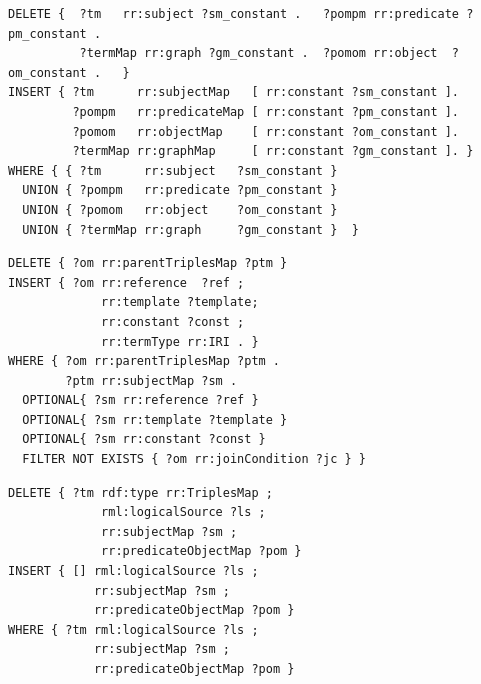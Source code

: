 \vspace{-2mm}
{
\fontsize{6}{6.5}
\begin{verbatim}
DELETE {  ?tm   rr:subject ?sm_constant .   ?pompm rr:predicate ?pm_constant .
          ?termMap rr:graph ?gm_constant .  ?pomom rr:object  ?om_constant .   }
INSERT { ?tm      rr:subjectMap   [ rr:constant ?sm_constant ].
         ?pompm   rr:predicateMap [ rr:constant ?pm_constant ].
         ?pomom   rr:objectMap    [ rr:constant ?om_constant ].
         ?termMap rr:graphMap     [ rr:constant ?gm_constant ]. }
WHERE { { ?tm      rr:subject   ?sm_constant }
  UNION { ?pompm   rr:predicate ?pm_constant }
  UNION { ?pomom   rr:object    ?om_constant }
  UNION { ?termMap rr:graph     ?gm_constant }  }
\end{verbatim}
}
\vspace{-2mm}

\vspace{2mm}
\noindent
    \begin{minipage}[t]{0.55\textwidth}
{
\fontsize{6}{6.5}
\begin{verbatim}
DELETE { ?om rr:parentTriplesMap ?ptm }
INSERT { ?om rr:reference  ?ref ;
             rr:template ?template; 
             rr:constant ?const ;
             rr:termType rr:IRI . }
WHERE { ?om rr:parentTriplesMap ?ptm .
        ?ptm rr:subjectMap ?sm . 
  OPTIONAL{ ?sm rr:reference ?ref }
  OPTIONAL{ ?sm rr:template ?template }
  OPTIONAL{ ?sm rr:constant ?const }
  FILTER NOT EXISTS { ?om rr:joinCondition ?jc } } 
\end{verbatim}
}
\vspace{-3mm}
    \end{minipage}%
    \hfill%
    \begin{minipage}[t]{0.4\textwidth}
{
\fontsize{6}{6.5}
\begin{verbatim}
DELETE { ?tm rdf:type rr:TriplesMap ;
             rml:logicalSource ?ls ;
             rr:subjectMap ?sm ;
             rr:predicateObjectMap ?pom }
INSERT { [] rml:logicalSource ?ls ;
            rr:subjectMap ?sm ; 
            rr:predicateObjectMap ?pom }
WHERE { ?tm rml:logicalSource ?ls ;
            rr:subjectMap ?sm ;
            rr:predicateObjectMap ?pom }
\end{verbatim}
}
\vspace{-3mm}
    \end{minipage}


